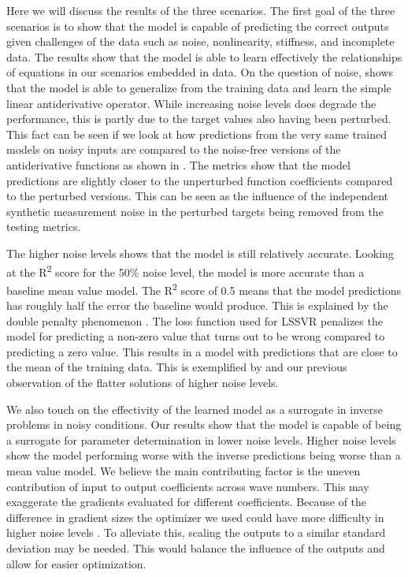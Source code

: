 \noindent Here we will discuss the results of the three scenarios. The first goal of the three scenarios is to show that the model is capable of predicting the correct outputs given challenges of the data such as noise, nonlinearity, stiffness, and incomplete data.
The results show that the model is able to learn effectively the relationships of equations in our scenarios embedded in data. On the question of noise,  shows that the model is able to generalize from the training data and learn the simple linear antiderivative operator. While increasing noise levels does degrade the performance, this is partly due to the target values also having been perturbed. This fact can be seen if we look at how predictions from the very same trained models on noisy inputs are compared to the noise-free versions of the antiderivative functions as shown in . The metrics show that the model predictions are slightly closer to the unperturbed function coefficients compared to the perturbed versions. This can be seen as the influence of the independent synthetic measurement noise in the perturbed targets being removed from the testing metrics.

The higher noise levels shows that the model is still relatively accurate. Looking at the R\textsuperscript{2} score for the 50\% noise level, the model is more accurate than a baseline mean value model. The R\textsuperscript{2} score of 0.5 means that the model predictions has roughly half the error the baseline would produce. This is explained by the double penalty phenomenon \autocite{lledoScaledependentVerificationPrecipitation2023}. The loss function used for LSSVR penalizes the model for predicting a non-zero value that turns out to be wrong compared to predicting a zero value. This results in a model with predictions that are close to the mean of the training data. This is exemplified by  and our previous observation of the flatter solutions of higher noise levels.

We also touch on the effectivity of the learned model as a surrogate in inverse problems in noisy conditions. Our results show that the model is capable of being a surrogate for parameter determination in lower noise levels. Higher noise levels show the model performing worse with the inverse predictions being worse than a mean value model. We believe the main contributing factor is the uneven contribution of input to output coefficients across wave numbers. This may exaggerate the gradients evaluated for different coefficients. Because of the difference in gradient sizes the optimizer we used could have more difficulty in higher noise levels \autocite{griffithsAchievingRobustnessAleatoric2022, ozbayramHeteroscedasticGaussianProcess2024,zhangImprovedAdamOptimizer2018}. To alleviate this, scaling the outputs to a similar standard deviation may be needed. This would balance the influence of the outputs and allow for easier optimization.

